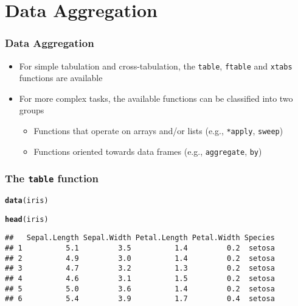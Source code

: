 \documentclass[paper=screen,mathserif]{beamer}\usepackage[]{graphicx}\usepackage[]{color}
\makeatletter
\newcommand{\hlstd}[1]{\textcolor[rgb]{0.345,0.345,0.345}{#1}}%
\newcommand{\hlkwd}[1]{\textcolor[rgb]{0.737,0.353,0.396}{\textbf{#1}}}%
\newenvironment{kframe}{%
 \def\at@end@of@kframe{}%
 \ifinner\ifhmode%
  \def\at@end@of@kframe{\end{minipage}}%
  \begin{minipage}{\columnwidth}%
 \fi\fi%
 \def\FrameCommand##1{\hskip\@totalleftmargin \hskip-\fboxsep
 \colorbox{shadecolor}{##1}\hskip-\fboxsep
     \hskip-\linewidth \hskip-\@totalleftmargin \hskip\columnwidth}%
 \MakeFramed {\advance\hsize-\width
   \@totalleftmargin\z@ \linewidth\hsize
   \@setminipage}}%
 {\par\unskip\endMakeFramed%
 \at@end@of@kframe}
\newenvironment{knitrout}{}{} %
\newcommand{\ft}[1]{\frametitle{#1}}
\makeatother
\begin{document}
\section{Data Aggregation}

\begin{frame}[fragile]
  \ft{Data Aggregation}
  
  \begin{itemize}
  \item For simple tabulation and cross-tabulation, the \verb=table=,
    \verb=ftable= and \verb=xtabs= functions are available
  \item For more complex tasks, the available functions can be
    classified into two groups
    \begin{itemize}
    \item Functions that operate on arrays and/or lists
      (e.g., \verb=*apply=, \verb=sweep=)
    \item Functions oriented towards data frames (e.g.,
      \verb=aggregate=, \verb=by=)
    \end{itemize}
  \end{itemize}
\end{frame}

\begin{frame}[fragile]
  \ft{The {\tt table} function}
  
\begin{knitrout}\scriptsize
{}\color{fgcolor}\begin{kframe}
\begin{alltt}
\hlkwd{data}\hlstd{(iris)}

\hlkwd{head}\hlstd{(iris)}
\end{alltt}
\begin{verbatim}
##   Sepal.Length Sepal.Width Petal.Length Petal.Width Species
## 1          5.1         3.5          1.4         0.2  setosa
## 2          4.9         3.0          1.4         0.2  setosa
## 3          4.7         3.2          1.3         0.2  setosa
## 4          4.6         3.1          1.5         0.2  setosa
## 5          5.0         3.6          1.4         0.2  setosa
## 6          5.4         3.9          1.7         0.4  setosa
\end{verbatim}
\end{kframe}
\end{knitrout}
\end{frame}
\end{document}
